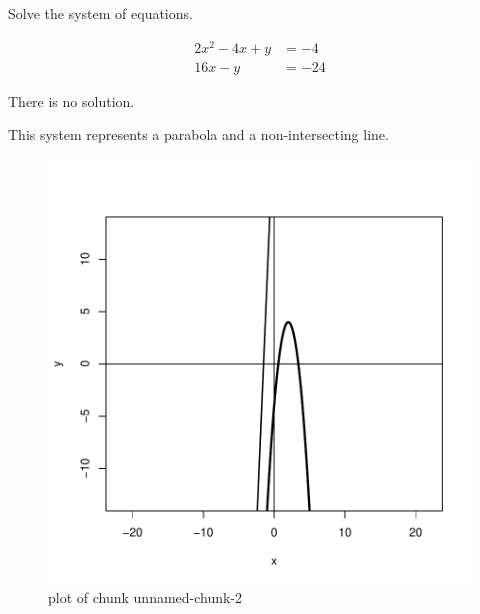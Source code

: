
\begin{question}
Solve the system of equations.

\[\begin{aligned}
2 x^{2} - 4 x + y &= -4 \\
16 x - y &= -24
\end{aligned}\]
\end{question}

\begin{solution}
There is no solution.

This system represents a parabola and a non-intersecting line.

\begin{figure}
\centering
\includegraphics{unnamed-chunk-2-1-3.pdf}
\caption{plot of chunk unnamed-chunk-2}
\end{figure}
\end{solution}

